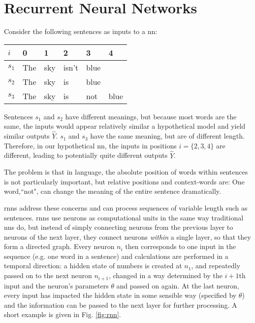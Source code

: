 \section{Recurrent Neural Networks \label{ssec: RNNs}}
    Consider the following sentences as inputs to a \gls{nn}:

    \begin{table}[H]
    \begin{tabular}{|l|l|l|l|l|l|}
        \hline
        $i$   & 0   & 1   & 2     & 3    & 4    \\ \hline
        $s_1$ & The & sky & isn't & blue &      \\ \hline
        $s_2$ & The & sky & is    & blue &      \\ \hline
        $s_3$ & The & sky & is    & not  & blue \\ \hline
    \end{tabular}
    \centering
    \end{table}
    \noindent %
    Sentences $s_1$ and $s_2$ have different meanings, but because most words are the same, the inputs would appear relatively similar a hypothetical \gls{model} and yield similar outputs $\hat{Y}$. $s_1$ and $s_3$ have the same meaning, but are of different length. Therefore, in our hypothetical \gls{nn}, the inputs in positions $i = \{2, 3, 4\}$ are different, leading to potentially quite different outputs $\hat{Y}$.

    The problem is that in language, the absolute position of words within sentences is not particularly important, but relative positions and context-words are: One word,``not", can change the meaning of the entire sentence dramatically.

     \Glspl{rnn} address these concerns and can process sequences of variable length such as sentences. \Glspl{rnn} use \glspl{neuron} as computational units in the same way traditional \glspl{nn} do, but instead of simply connecting \glspl{neuron} from the previous layer to \glspl{neuron} of the next layer, they connect \glspl{neuron} \textit{within} a single layer, so that they form a directed graph. Every \gls{neuron} $n_i$ then corresponds to one input in the sequence (e.g. one word in a sentence) and calculations are performed in a temporal direction: a hidden state of numbers is created at $n_1$, and repeatedly passed on to the next \gls{neuron} $n_{i+1}$, changed in a way determined by the $i+1$th input and the \gls{neuron}'s parameters $\theta$ and passed on again. At the last \gls{neuron}, every input has impacted the hidden state in some sensible way (specified by $\theta$) and the information can be passed to the next layer for further processing. A short example is given in Fig. \ref{fig:rnn}.
     
